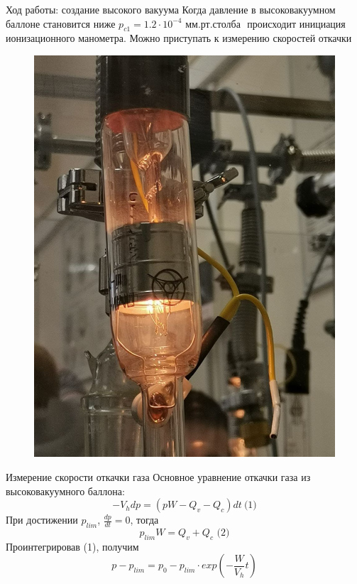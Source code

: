\begin{frame}{Ход работы: создание высокого вакуума}
    Когда давление в высоковакуумном баллоне становится ниже \(p_{c1}=1.2 \cdot 10^{-4} \text{ мм.рт.столба }\)
    происходит инициация ионизационного манометра. Можно приступать к измерению скоростей откачки
    \begin{figure}[h]
        \centering
        \includegraphics[scale = 0.12]{images/ion.jpg}
    \end{figure}
\end{frame}
\begin{frame}{Измерение скорости откачки газа}
   Основное уравнение откачки газа из высоковакуумного баллона:
   \[-V_hdp = (pW - Q_v - Q_c)dt \ \text{(1)}\]
   При достижении \(p_{lim}\), \text{  } \(\frac{dp}{dt} = 0\), тогда
   \[p_{lim}W = Q_v + Q_c \text{  (2)}\]
   Проинтегрировав (1), получим
   \[p-p_{lim} = p_0-p_{lim}\cdot exp(-\frac{W}{V_h}t)\]
\end{frame}

